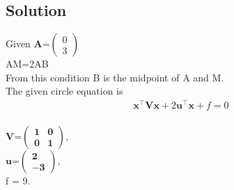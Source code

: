 \documentclass[10pt,a4paper]{report}
\newcommand{\myvec}[1]{\ensuremath{\begin{pmatrix}#1\end{pmatrix}}}
\let\vec\mathbf
\begin{document}
\begin{multicols}{2}
\section*{Solution}
Given $\vec{A}$=$\myvec{0 \\ 3}$
\vspace{0.25cm}\\
AM=2AB
\vspace{0.25cm}\\
From this condition B is the midpoint of A and M.
\\
The given circle equation is 
\begin{align}
\vec{x}^{\top}\vec{V}\vec{x}+2\vec{u}^{\top}\vec{x}+f=0
\end{align}
\vspace{0.25cm}\\
$\vec{V}$=$\vec{ \begin{pmatrix}1 & 0 \\ 0 & 1 \end{pmatrix}}$, 
\vspace{0.25cm}\\
$\vec{u}$=$\vec{ \begin{pmatrix}2 \\ -3 \end{pmatrix}}$, 
\vspace{0.25cm}\\
f = 9.


\end{multicols}
\end{document}

